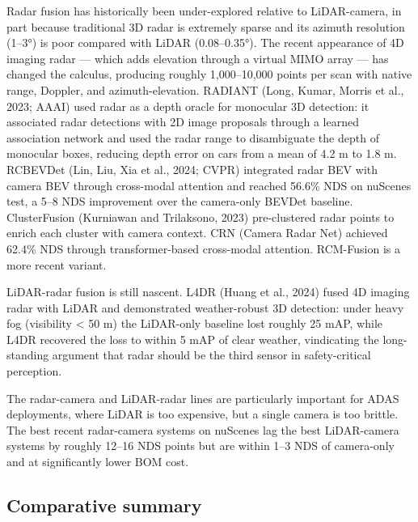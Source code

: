Radar fusion has historically been under-explored relative to LiDAR-camera, in part because traditional 3D radar is extremely sparse and its azimuth resolution (1--3°) is poor compared with LiDAR (0.08--0.35°). The recent appearance of 4D imaging radar --- which adds elevation through a virtual MIMO array --- has changed the calculus, producing roughly 1,000--10,000 points per scan with native range, Doppler, and azimuth-elevation. RADIANT (Long, Kumar, Morris et al., 2023; AAAI) used radar as a depth oracle for monocular 3D detection: it associated radar detections with 2D image proposals through a learned association network and used the radar range to disambiguate the depth of monocular boxes, reducing depth error on cars from a mean of 4.2 m to 1.8 m. RCBEVDet (Lin, Liu, Xia et al., 2024; CVPR) integrated radar BEV with camera BEV through cross-modal attention and reached 56.6\% NDS on nuScenes test, a 5--8 NDS improvement over the camera-only BEVDet baseline. ClusterFusion (Kurniawan and Trilaksono, 2023) pre-clustered radar points to enrich each cluster with camera context. CRN (Camera Radar Net) achieved 62.4\% NDS through transformer-based cross-modal attention. RCM-Fusion is a more recent variant.

LiDAR-radar fusion is still nascent. L4DR (Huang et al., 2024) fused 4D imaging radar with LiDAR and demonstrated weather-robust 3D detection: under heavy fog (visibility \textless{} 50 m) the LiDAR-only baseline lost roughly 25 mAP, while L4DR recovered the loss to within 5 mAP of clear weather, vindicating the long-standing argument that radar should be the third sensor in safety-critical perception.

The radar-camera and LiDAR-radar lines are particularly important for ADAS deployments, where LiDAR is too expensive, but a single camera is too brittle. The best recent radar-camera systems on nuScenes lag the best LiDAR-camera systems by roughly 12--16 NDS points but are within 1--3 NDS of camera-only and at significantly lower BOM cost.

\subsection{Comparative summary}\label{comparative-summary}

